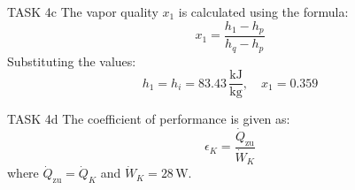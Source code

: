 TASK 4c  
The vapor quality \( x_1 \) is calculated using the formula:  
\[
x_1 = \frac{h_1 - h_p}{h_q - h_p}
\]  
Substituting the values:  
\[
h_1 = h_i = 83.43 \, \frac{\text{kJ}}{\text{kg}}, \quad x_1 = 0.359
\]  

TASK 4d  
The coefficient of performance is given as:  
\[
\epsilon_K = \frac{\dot{Q}_{\text{zu}}}{\dot{W}_K}
\]  
where \( \dot{Q}_{\text{zu}} = \dot{Q}_K \) and \( \dot{W}_K = 28 \, \text{W} \).